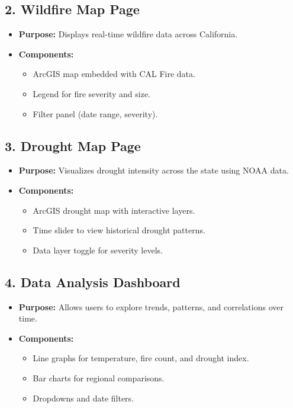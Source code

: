 \documentclass[12pt]{article}
\begin{document}
\subsection{2. Wildfire Map Page}
\begin{itemize}[leftmargin=*]
    \item \textbf{Purpose:} Displays real-time wildfire data across California.
    \item \textbf{Components:}
    \begin{itemize}
        \item ArcGIS map embedded with CAL Fire data.
        \item Legend for fire severity and size.
        \item Filter panel (date range, severity).
    \end{itemize}
\end{itemize}

\subsection{3. Drought Map Page}
\begin{itemize}[leftmargin=*]
    \item \textbf{Purpose:} Visualizes drought intensity across the state using NOAA data.
    \item \textbf{Components:}
    \begin{itemize}
        \item ArcGIS drought map with interactive layers.
        \item Time slider to view historical drought patterns.
        \item Data layer toggle for severity levels.
    \end{itemize}
\end{itemize}

\subsection{4. Data Analysis Dashboard}
\begin{itemize}[leftmargin=*]
    \item \textbf{Purpose:} Allows users to explore trends, patterns, and correlations over time.
    \item \textbf{Components:}
    \begin{itemize}
        \item Line graphs for temperature, fire count, and drought index.
        \item Bar charts for regional comparisons.
        \item Dropdowns and date filters.
    \end{itemize}
\end{itemize}
\end{document}
